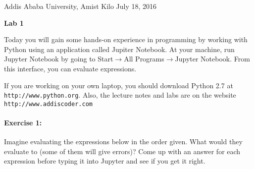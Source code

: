 \documentclass[11pt]{article}
\newlength{\toppush}
\newcommand{\htitle}[2]{\noindent\vspace*{-\toppush}\newline\parbox{6.5in}
 {\large Addis Ababa University, Amist Kilo \hfill #1\newline
\hspace*{\fill}{\bf Algorithms and Programming for High Schoolers} \hspace*{\fill} \newline
\mbox{}\hrulefill\mbox{}}\vspace*{1ex}\mbox{}\newline
\begin{center}{\Large\bf #2}\end{center}}
\begin{document}
\htitle{July 18, 2016}{Lab 1}

Today you will gain some hands-on experience in programming by
working with Python using an application called Jupiter Notebook.  At your machine, run Jupyter Notebook by going to
Start$\rightarrow$All Programs$\rightarrow$Jupyter Notebook. From this interface, you can evaluate expressions.

If you are working on your own laptop, you should download Python 2.7
at \texttt{http://www.python.org}.  Also, the lecture notes and labs
are on the website \texttt{http://www.addiscoder.com}

\paragraph{Exercise 1:}
Imagine evaluating the expressions below in the order given.
What would they evaluate to (some of them will give
errors)? Come up with an answer for
each expression before typing it into Jupyter and see if you get it
right.
\end{document}
